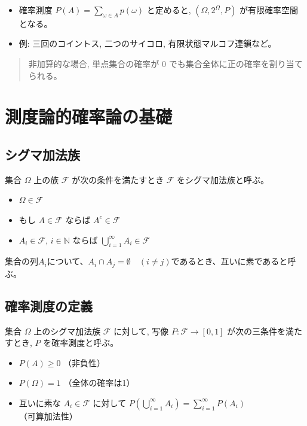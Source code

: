\documentclass[uplatex,dvipdfmx,11pt,a4paper,openany]{bxjsbook}
\newenvironment{noteblock}{\begin{quote}\color{black!72}\small}{\end{quote}}
\begin{document}
\begin{itemize}
\item 確率測度 $P(A) = \sum_{\omega \in A} p(\omega)$ と定めると, $(\Omega, 2^{\Omega}, P)$ が有限確率空間となる。
\item 例: 三回のコイントス, 二つのサイコロ, 有限状態マルコフ連鎖など。
\end{itemize}

\begin{noteblock}
非加算的な場合, 単点集合の確率が 0 でも集合全体に正の確率を割り当てられる。
\end{noteblock}

\section{測度論的確率論の基礎}
\subsection{シグマ加法族}
集合 $\Omega$ 上の族 $\mathcal{F}$ が次の条件を満たすとき $\mathcal{F}$ をシグマ加法族と呼ぶ。

\begin{itemize}
\item $\Omega \in \mathcal{F}$
\item もし $A \in \mathcal{F}$ ならば $A^{c} \in \mathcal{F}$
\item $A_i \in \mathcal{F}$, $i \in \mathbb{N}$ ならば $\bigcup_{i=1}^{\infty} A_i \in \mathcal{F}$
\end{itemize}

集合の列$A_i$について、$A_i\cap A_j=\emptyset\quad (i\neq j)$であるとき、互いに素であると呼ぶ。

\subsection{確率測度の定義}
集合 $\Omega$ 上のシグマ加法族 $\mathcal{F}$ に対して, 写像 $P : \mathcal{F} \to [0,1]$ が次の三条件を満たすとき, $P$ を確率測度と呼ぶ。

\begin{itemize}
\item $P(A) \ge 0$ （非負性）
\item $P(\Omega) = 1$ （全体の確率は1）
\item 互いに素な $A_i \in \mathcal{F}$ に対して $P\!\left(\bigcup_{i=1}^{\infty} A_i\right) = \sum_{i=1}^{\infty} P(A_i)$ （可算加法性）
\end{itemize}
\end{document}

